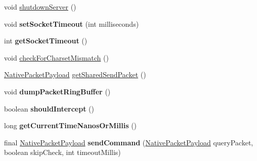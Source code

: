 \begin{DoxyCompactItemize}
void \mbox{\hyperlink{classcom_1_1mysql_1_1cj_1_1_native_session_a7237ecf5054050d24533806a4a548777}{shutdown\+Server}} ()
\item 
\mbox{\label{classcom_1_1mysql_1_1cj_1_1_native_session_a021114685b1730924669be2122f6c53d}} 
void {\bfseries set\+Socket\+Timeout} (int milliseconds)
\item 
\mbox{\label{classcom_1_1mysql_1_1cj_1_1_native_session_a65e529c9db707ecccd842853281963c8}} 
int {\bfseries get\+Socket\+Timeout} ()
\item 
void \mbox{\hyperlink{classcom_1_1mysql_1_1cj_1_1_native_session_a384334014fbd4629e94632d30618ef4f}{check\+For\+Charset\+Mismatch}} ()
\item 
\mbox{\hyperlink{classcom_1_1mysql_1_1cj_1_1protocol_1_1a_1_1_native_packet_payload}{Native\+Packet\+Payload}} \mbox{\hyperlink{classcom_1_1mysql_1_1cj_1_1_native_session_a992bfbb8f5cd5ba3bddcc850691ce4e3}{get\+Shared\+Send\+Packet}} ()
\item 
\mbox{\label{classcom_1_1mysql_1_1cj_1_1_native_session_a7a51725820573809d0fe015fb790a9b3}} 
void {\bfseries dump\+Packet\+Ring\+Buffer} ()
\item 
\mbox{\label{classcom_1_1mysql_1_1cj_1_1_native_session_af6ab4b22c01684f4ce3928c5e2315b06}} 
boolean {\bfseries should\+Intercept} ()
\item 
\mbox{\label{classcom_1_1mysql_1_1cj_1_1_native_session_aa737fa8725527081fb414d39978e895a}} 
long {\bfseries get\+Current\+Time\+Nanos\+Or\+Millis} ()
\item 
\mbox{\label{classcom_1_1mysql_1_1cj_1_1_native_session_aa4d084f0835dcbdfacc495070d84b8bf}} 
final \mbox{\hyperlink{classcom_1_1mysql_1_1cj_1_1protocol_1_1a_1_1_native_packet_payload}{Native\+Packet\+Payload}} {\bfseries send\+Command} (\mbox{\hyperlink{classcom_1_1mysql_1_1cj_1_1protocol_1_1a_1_1_native_packet_payload}{Native\+Packet\+Payload}} query\+Packet, boolean skip\+Check, int timeout\+Millis)
\item 
\mbox{\label{classcom_1_1mysql_1_1cj_1_1_native_session_ae23927cce89ee197455c3524be0266b0}} 

\end{DoxyCompactItemize}
